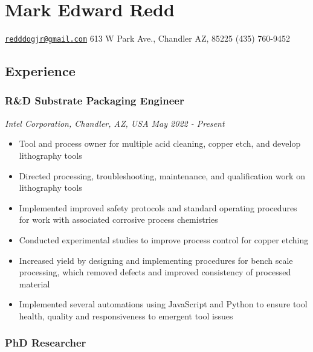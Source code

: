 
\section{Mark Edward Redd}\label{mark-edward-redd}

\href{mailto:redddogjr@gmail.com}{\nolinkurl{redddogjr@gmail.com}}
\textbar{} 613 W Park Ave., Chandler AZ, 85225 \textbar{} (435) 760-9452


\subsection{Experience}\label{experience}

\subsubsection{R\&D Substrate Packaging
Engineer}\label{rd-substrate-packaging-engineer}

\emph{Intel Corporation, Chandler, AZ, USA \textbar{} May 2022 -
Present}

\begin{itemize}
\tightlist
\item
  Tool and process owner for multiple acid cleaning, copper etch, and
  develop lithography tools
\item
  Directed processing, troubleshooting, maintenance, and qualification
  work on lithography tools
\item
  Implemented improved safety protocols and standard operating
  procedures for work with associated corrosive process chemistries
\item
  Conducted experimental studies to improve process control for copper
  etching
\item
  Increased yield by designing and implementing procedures for bench
  scale processing, which removed defects and improved consistency of
  processed material
\item
  Implemented several automations using JavaScript and Python to ensure
  tool health, quality and responsiveness to emergent tool issues
\end{itemize}

\subsubsection{PhD Researcher}\label{phd-researcher}


